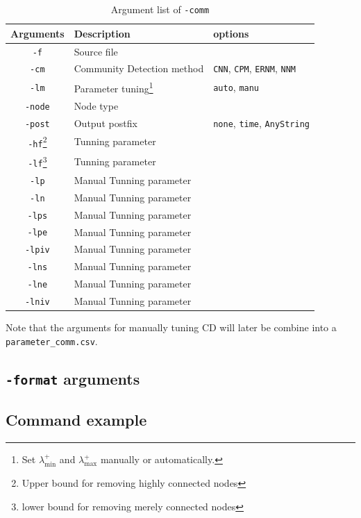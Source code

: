 \documentclass[11pt,a4paper]{article}
\theoremstyle{definition}
\theoremstyle{definition}
\numberwithin{equation}{section}
\begin{document}
		\begin{table}[!h]
		\centering
		\begin{tabular}{cll}
			\hline
			Arguments & Description & options\\
			\hline
			\texttt{-f}& Source file &  \\
			\hline
			\texttt{-cm}& Community Detection method & \texttt{CNN}, \texttt{CPM}, \texttt{ERNM}, \texttt{NNM}\\
			\hline
			\texttt{-lm}& Parameter tuning\footnote{Set $\lambda^+_{\min}$ and $\lambda^+_{\max}$ manually or automatically.}& \texttt{auto}, \texttt{manu}\\
			\hline
			\texttt{-node}& Node type& \\
			\hline
			\texttt{-post}& Output postfix & \texttt{none}, \texttt{time}, \texttt{AnyString}\\
			\hline
			\texttt{-hf}\footnote{Upper bound for removing highly connected nodes}& Tunning parameter&\\
			\hline
			\texttt{-lf}\footnote{lower bound for removing merely connected nodes}& Tunning parameter&\\
			\hline
			\texttt{-lp}& Manual Tunning parameter&\\
			\hline
			\texttt{-ln}& Manual Tunning parameter&\\
			\hline
			\texttt{-lps}& Manual Tunning parameter& \\
			\hline
			\texttt{-lpe}& Manual Tunning parameter&\\
			\hline
			\texttt{-lpiv}& Manual Tunning parameter&\\
			\hline
			\texttt{-lns}& Manual Tunning parameter&\\
			\hline
			\texttt{-lne}& Manual Tunning parameter&\\
			\hline
			\texttt{-lniv}& Manual Tunning parameter&\\
			\hline
		\end{tabular}
		\caption{Argument list of \texttt{-comm}}
		\label{tab:commlist}
	\end{table}

	Note that the arguments for manually tuning CD will later be combine into a \texttt{parameter\_comm.csv}. 
	
	\subsection{\texttt{-format} arguments}
	
	\subsection{Command example}
	
\end{document}
